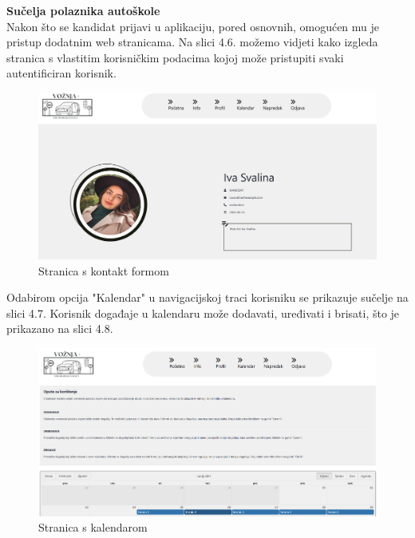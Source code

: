 \noindent \textbf{Sučelja polaznika autoškole }\\

\noindent Nakon što se kandidat prijavi u aplikaciju, pored osnovnih, omogućen mu je pristup dodatnim web stranicama. Na slici 4.6. možemo vidjeti kako izgleda stranica s vlastitim korisničkim podacima kojoj može pristupiti svaki autentificiran korisnik.

\begin{figure}[H]
					\includegraphics[width=\textwidth]{slike/kandidat1.png} 
					\centering
					\caption{Stranica s kontakt formom}
					\label{fig:promjene}
				\end{figure}

\noindent Odabirom opcija "Kalendar" u navigacijskoj traci korisniku se prikazuje sučelje na slici 4.7. Korisnik događaje u kalendaru može dodavati, uređivati i brisati, što je prikazano na slici 4.8.

\begin{figure}[H]
					\includegraphics[width=\textwidth]{slike/kandidat2.png} 
					\centering
					\caption{Stranica s kalendarom}
					\label{fig:promjene}
				\end{figure}

